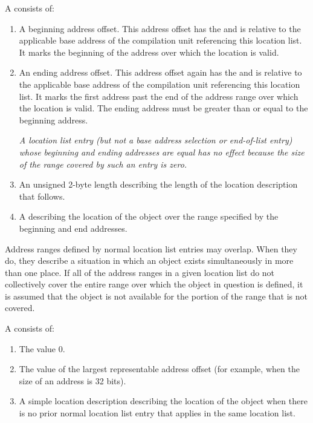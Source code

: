 A
 consists of:
\begin{enumerate}[1. ]
\item A beginning address offset. 
This address offset has the  and is
relative to the applicable base address of the compilation
unit referencing this location list. It marks the beginning
of the address 
over which the location is valid.

\item An ending address offset.  This address offset again
has the  and is relative to the applicable
base address of the compilation unit referencing this location
list. It marks the first address past the end of the address
range over which the location is valid. The ending address
must be greater than or equal to the beginning address.

\textit{A location list entry (but not a base address selection or 
end-of-list entry) whose beginning
and ending addresses are equal has no effect 
because the size of the range covered by such
an entry is zero.}

\item An unsigned 2-byte length describing the length of the location 
description that follows.

\item A  
describing the location of the object over the range specified by
the beginning and end addresses.
\end{enumerate}

Address ranges defined by normal location list entries
may overlap. When they do, they describe a
situation in which an object exists simultaneously in more than
one place. If all of the address ranges in a given location
list do not collectively cover the entire range over which the
object in question is defined, it is assumed that the object is
not available for the portion of the range that is not covered.

A  consists of:
\begin{enumerate}[1. ]
\item The value 0.
\item The value of the largest representable address offset (for
      example, \wffffffff when the size of an address is 32 bits).
\item A simple location description describing the location of the
      object when there is no prior normal location list entry
      that applies in the same location list.
\end{enumerate}

